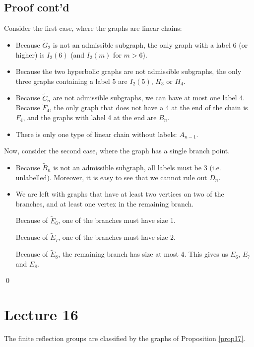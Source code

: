 \subsection{Proof cont'd}

Consider the first case, where the graphs are linear chains:

\begin{itemize}
\item
Because $\widetilde{G}_2$ is not an admissible subgraph, the only graph with a
label 6 (or higher) is $I_2(6)$ (and $I_2(m)$ for $m > 6$).
\item
Because the two hyperbolic graphs are not admissible subgraphs, the only three
graphs containing a label 5 are $I_2(5)$, $H_3$ or $H_4$.
\item
Because $\widetilde{C}_n$ are not admissible subgraphs, we can have at most
one label 4. Because $\widetilde{F}_4$, the only graph that does not have a 4
at the end of the chain is $F_4$, and the graphs with label 4 at the end are
$B_n$.
\item
There is only one type of linear chain without labels: $A_{n-1}$.
\end{itemize}

Now, consider the second case, where the graph has a single branch point.

\begin{itemize}
\item
Because $\widetilde{B}_n$ is not an admissible subgraph, all labels must be
3 (i.e. unlabelled). Moreover, it is easy to see that we cannot rule out
$D_n$.
\item
We are left with graphs that have at least two vertices on two of the branches,
and at least one vertex in the remaining branch.     %

Because of $\widetilde{E}_6$, one of the branches must have size 1.

Because of $\widetilde{E}_7$, one of the branches must have size 2.

Because of $\widetilde{E}_8$, the remaining branch has size at most 4. This
gives us $E_6$, $E_7$ and $E_8$.
\end{itemize}

\qed

\section{Lecture 16}

\begin{theorem} \label{thm18}
The finite reflection groups are classified by the graphs of Proposition
\ref{prop17}.
\end{theorem}

